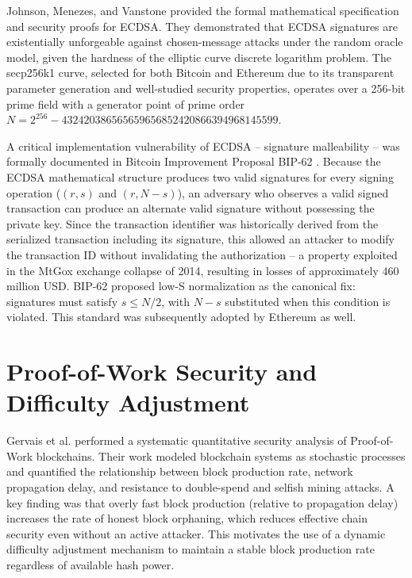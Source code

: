 \documentclass[12pt,a4paper]{report}
\begin{document}
Johnson, Menezes, and Vanstone \cite{johnson2001} provided the formal mathematical
specification and security proofs for ECDSA. They demonstrated that ECDSA signatures
are existentially unforgeable against chosen-message attacks under the random oracle model,
given the hardness of the elliptic curve discrete logarithm problem. The secp256k1 curve,
selected for both Bitcoin and Ethereum due to its transparent parameter generation and
well-studied security properties, operates over a 256-bit prime field with a generator
point of prime order $N = 2^{256} - 432420386565659656852420866394968145599$.

A critical implementation vulnerability of ECDSA -- signature malleability -- was
formally documented in Bitcoin Improvement Proposal BIP-62 \cite{bip62}. Because the
ECDSA mathematical structure produces two valid signatures for every signing operation
($(r, s)$ and $(r, N-s)$), an adversary who observes a valid signed transaction can
produce an alternate valid signature without possessing the private key. Since the
transaction identifier was historically derived from the serialized transaction including
its signature, this allowed an attacker to modify the transaction ID without invalidating
the authorization -- a property exploited in the MtGox exchange collapse of 2014,
resulting in losses of approximately 460 million USD. BIP-62 proposed low-S normalization
as the canonical fix: signatures must satisfy $s \leq N/2$, with $N-s$ substituted when
this condition is violated. This standard was subsequently adopted by Ethereum as well.

\section{Proof-of-Work Security and Difficulty Adjustment}

Gervais et al. \cite{gervais2016} performed a systematic quantitative security analysis
of Proof-of-Work blockchains. Their work modeled blockchain systems as stochastic
processes and quantified the relationship between block production rate, network
propagation delay, and resistance to double-spend and selfish mining attacks. A key
finding was that overly fast block production (relative to propagation delay) increases
the rate of honest block orphaning, which reduces effective chain security even without
an active attacker. This motivates the use of a dynamic difficulty adjustment mechanism
to maintain a stable block production rate regardless of available hash power.
\end{document}

